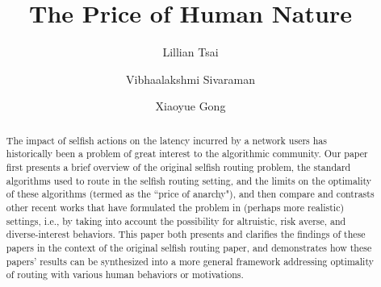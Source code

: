 \documentclass[acmlarge]{acmart}
\begin{document}
\title{The Price of Human Nature}

\author{Lillian Tsai}
\author{Vibhaalakshmi Sivaraman}
\author{Xiaoyue Gong}

\begin{abstract}
The impact of selfish actions on the latency incurred by a network users has historically been a problem of great interest to the algorithmic community. Our paper first presents a brief overview of the original selfish routing problem, the standard algorithms used to route in the selfish routing setting, and the limits on the optimality of these algorithms (termed as the ``price of anarchy"), and then compare and contrasts other recent works that have formulated the problem in
    (perhaps more realistic) settings, i.e., by taking into account the possibility for altruistic, risk averse, and diverse-interest behaviors.  This paper both presents and clarifies the findings of these papers in the context of the original selfish routing paper, and demonstrates how these papers' results can be synthesized into a more general framework addressing optimality of routing with various human behaviors or motivations.
\end{abstract}


\maketitle

\end{document}
